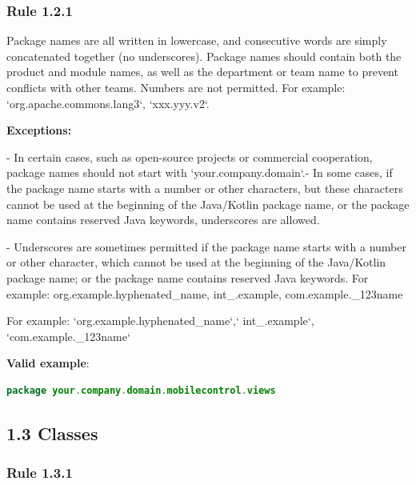 \subsubsection*{\textbf{Rule 1.2.1}}
\leavevmode\newline

Package names are all written in lowercase, and consecutive words are simply concatenated together (no underscores). Package names should contain both the product and module names, as well as the department or team name to prevent conflicts with other teams.  Numbers are not permitted. For example: `org.apache.commons.lang3`, `xxx.yyy.v2`.



\textbf{Exceptions:} 



- In certain cases, such as open-source projects or commercial cooperation, package names should not start with `your.company.domain`.- In some cases, if the package name starts with a number or other characters, but these characters cannot be used at the beginning of the Java/Kotlin package name, or the package name contains reserved Java keywords, underscores are allowed.

- Underscores are sometimes permitted if the package name starts with a number or other character, which cannot be used at the beginning of the Java/Kotlin package name; or the package name contains reserved Java keywords. For example: org.example.hyphenated\_name, int\_.example, com.example.\_123name   

For example: `org.example.hyphenated_name`,` int_.example`, `com.example._123name`



\textbf{Valid example}: 

\begin{lstlisting}[language=Kotlin]
package your.company.domain.mobilecontrol.views
\end{lstlisting}


\subsection*{\textbf{1.3 Classes}}

\subsubsection*{\textbf{Rule 1.3.1}}
\leavevmode\newline



